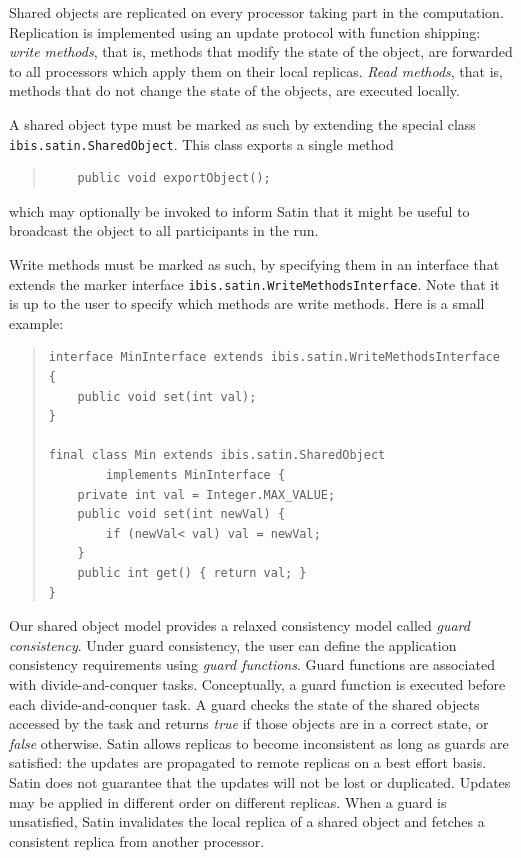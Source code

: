 \documentclass[10pt]{article}
\begin{document}
Shared objects are replicated on every
processor taking part in the computation. Replication is implemented using
an update protocol with function shipping: \textit{write methods},
that is, methods that modify
the state of the object, are forwarded to all processors
which apply them on their local replicas. \textit{Read methods}, that
is, methods that do not change the state of the objects, are
executed locally. 

A shared object type must be marked as such by extending the special class
\texttt{ibis.satin.SharedObject}.
This class exports a single method
{\small
\begin{quote}
\begin{verbatim}
    public void exportObject();
\end{verbatim}
\end{quote}
}
which may optionally be invoked to inform Satin that it might be useful to
broadcast the object to all participants in the run. 

Write methods must be marked as such, by specifying them in an interface
that extends the marker interface \texttt{ibis.satin.WriteMethodsInterface}.
Note that it is up to the user to specify which methods are write methods.
Here is a small example:

{\small
\begin{quote}
\begin{verbatim}
interface MinInterface extends ibis.satin.WriteMethodsInterface {
    public void set(int val);
}

final class Min extends ibis.satin.SharedObject
        implements MinInterface {
    private int val = Integer.MAX_VALUE;
    public void set(int newVal) {
        if (newVal< val) val = newVal;
    }
    public int get() { return val; }
}

\end{verbatim}
\end{quote}
}

Our shared object model provides a relaxed consistency model called
\textit{guard consistency}.
Under guard consistency, the user can define the application consistency
requirements using \textit{guard functions}. Guard functions are
associated with divide-and-conquer tasks. Conceptually, a guard
function is executed before each divide-and-conquer task.
A guard checks the state of the shared objects accessed by the task and
returns \textit{true} if those objects are in a correct state,
or \textit{false} otherwise.
Satin allows replicas to become inconsistent as long as
guards are satisfied: the updates are propagated to remote replicas on a
best effort basis.
Satin does not guarantee that the updates will not be lost or duplicated.
Updates may be applied in different order on different replicas.
When a guard is unsatisfied, Satin invalidates the local replica of a shared
object and fetches a consistent replica from another processor.
\end{document}
